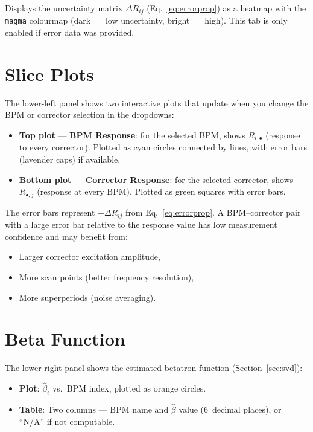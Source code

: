 \documentclass[11pt,a4paper,twoside]{report}
\begin{document}
Displays the uncertainty matrix $\Delta R_{ij}$ (Eq.~\ref{eq:errorprop}) as a heatmap with the \texttt{magma} colourmap (dark~=~low uncertainty, bright~=~high). This tab is only enabled if error data was provided.

\section{Slice Plots}

The lower-left panel shows two interactive plots that update when you change the BPM or corrector selection in the dropdowns:

\begin{itemize}
  \item \textbf{Top plot} --- \textcolor{accent}{\textbf{BPM Response}}: for the selected BPM, shows $R_{i,\bullet}$ (response to every corrector). Plotted as cyan circles connected by lines, with error bars (lavender caps) if available.
  \item \textbf{Bottom plot} --- \textcolor{accent2}{\textbf{Corrector Response}}: for the selected corrector, shows $R_{\bullet,j}$ (response at every BPM). Plotted as green squares with error bars.
\end{itemize}

\begin{notebox}
The error bars represent $\pm\Delta R_{ij}$ from Eq.~\ref{eq:errorprop}. A BPM--corrector pair with a large error bar relative to the response value has low measurement confidence and may benefit from:
\begin{itemize}
  \item Larger corrector excitation amplitude,
  \item More scan points (better frequency resolution),
  \item More superperiods (noise averaging).
\end{itemize}
\end{notebox}

\section{Beta Function}

The lower-right panel shows the estimated betatron function (Section~\ref{sec:svd}):

\begin{itemize}
  \item \textbf{Plot}: $\hat{\beta}_i$ vs.\ BPM index, plotted as orange circles.
  \item \textbf{Table}: Two columns --- BPM name and $\hat{\beta}$ value (6~decimal places), or ``N/A'' if not computable.
\end{itemize}
\end{document}
